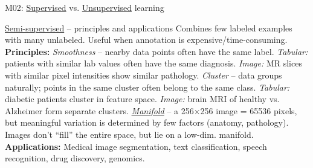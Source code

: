\documentclass[aspectratio=169, 10pt]{beamer}
\begin{document}
\begin{frame}{M02: \href{https://en.wikipedia.org/wiki/Supervised_learning}{Supervised} vs. \href{https://en.wikipedia.org/wiki/Unsupervised_learning}{Unsupervised} learning}
    \vspace{2mm}
    \begin{block}{\footnotesize \href{https://en.wikipedia.org/wiki/Semi-supervised_learning}{Semi-supervised} -- principles and applications}
        \scriptsize
        Combines few labeled examples with many unlabeled. Useful when annotation is expensive/time-consuming.\\[2pt]
        \textbf{Principles:}
        \textit{Smoothness} -- nearby data points often have the same label. \textit{Tabular:} patients with similar lab values often have the same diagnosis. \textit{Image:} MR slices with similar pixel intensities show similar pathology.
        \textit{Cluster} -- data groups naturally; points in the same cluster often belong to the same class. \textit{Tabular:} diabetic patients cluster in feature space. \textit{Image:} brain MRI of healthy vs. Alzheimer form separate clusters.
        \href{https://en.wikipedia.org/wiki/Manifold_hypothesis}{\textit{Manifold}} -- a 256$\times$256 image = 65536 pixels, but meaningful variation is determined by few factors (anatomy, pathology). Images don't ``fill'' the entire space, but lie on a low-dim. manifold.\\[2pt]
        \textbf{Applications:} Medical image segmentation, text classification, speech recognition, drug discovery, genomics.
    \end{block}

\end{frame}
\end{document}
